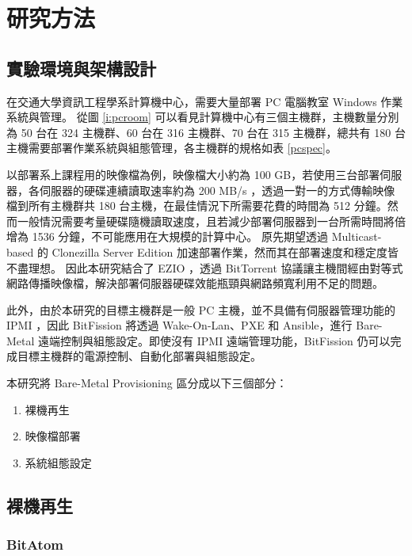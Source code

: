 \chapter{研究方法}
\section{實驗環境與架構設計}



在交通大學資訊工程學系計算機中心，需要大量部署 PC 電腦教室 Windows 作業系統與管理。
從圖 \ref{i:pcroom} 可以看見計算機中心有三個主機群，主機數量分別為 50 台在 324 主機群、60 台在 316 主機群、70 台在 315 主機群，總共有 180 台主機需要部署作業系統與組態管理，各主機群的規格如表 \ref{pcspec}。





以部署系上課程用的映像檔為例，映像檔大小約為 100 GB，若使用三台部署伺服器，各伺服器的硬碟連續讀取速率約為 200 MB/s ，透過一對一的方式傳輸映像檔到所有主機群共 180 台主機，在最佳情況下所需要花費的時間為 512 分鐘。然而一般情況需要考量硬碟隨機讀取速度，且若減少部署伺服器到一台所需時間將倍增為 1536 分鐘，不可能應用在大規模的計算中心。
原先期望透過 Multicast-based 的 Clonezilla Server Edition 加速部署作業，然而其在部署速度和穩定度皆不盡理想。
因此本研究結合了 EZIO ，透過 BitTorrent 協議讓主機間經由對等式網路傳播映像檔，解決部署伺服器硬碟效能瓶頸與網路頻寬利用不足的問題。


此外，由於本研究的目標主機群是一般 PC 主機，並不具備有伺服器管理功能的 IPMI ，因此 BitFission 將透過 Wake-On-Lan、PXE 和 Ansible，進行 Bare-Metal 遠端控制與組態設定。即使沒有 IPMI 遠端管理功能，BitFission 仍可以完成目標主機群的電源控制、自動化部署與組態設定。


本研究將 Bare-Metal Provisioning 區分成以下三個部分：

\begin{enumerate}
\item 裸機再生
\item 映像檔部署
\item 系統組態設定
\end{enumerate}


\section{裸機再生}
\subsection{BitAtom}


